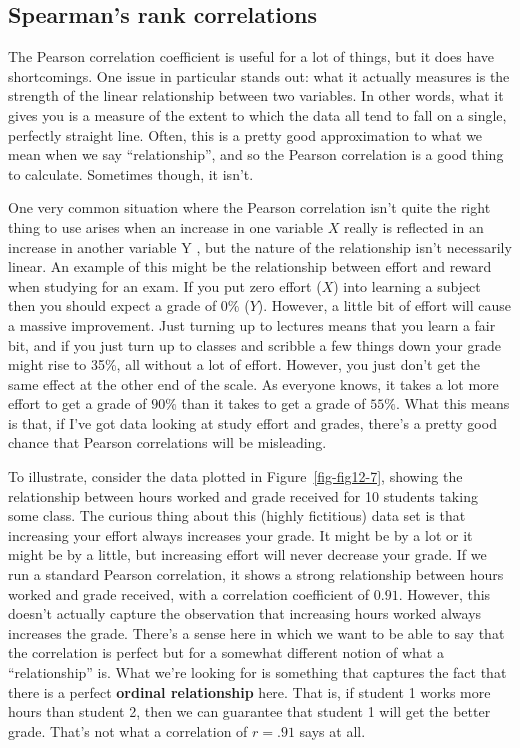 \documentclass[
  a4paper,
]{book}
\begin{document}
\hypertarget{spearmans-rank-correlations}{%
\subsection{Spearman's rank
correlations}\label{spearmans-rank-correlations}}

The Pearson correlation coefficient is useful for a lot of things, but
it does have shortcomings. One issue in particular stands out: what it
actually measures is the strength of the linear relationship between two
variables. In other words, what it gives you is a measure of the extent
to which the data all tend to fall on a single, perfectly straight line.
Often, this is a pretty good approximation to what we mean when we say
``relationship'', and so the Pearson correlation is a good thing to
calculate. Sometimes though, it isn't.

One very common situation where the Pearson correlation isn't quite the
right thing to use arises when an increase in one variable \(X\) really
is reflected in an increase in another variable Y , but the nature of
the relationship isn't necessarily linear. An example of this might be
the relationship between effort and reward when studying for an exam. If
you put zero effort (\(X\)) into learning a subject then you should
expect a grade of \(0\%\) (\(Y\)). However, a little bit of effort will
cause a massive improvement. Just turning up to lectures means that you
learn a fair bit, and if you just turn up to classes and scribble a few
things down your grade might rise to 35\%, all without a lot of effort.
However, you just don't get the same effect at the other end of the
scale. As everyone knows, it takes a lot more effort to get a grade of
\(90\%\) than it takes to get a grade of \(55\%\). What this means is
that, if I've got data looking at study effort and grades, there's a
pretty good chance that Pearson correlations will be misleading.

To illustrate, consider the data plotted in Figure~\ref{fig-fig12-7},
showing the relationship between hours worked and grade received for 10
students taking some class. The curious thing about this (highly
fictitious) data set is that increasing your effort always increases
your grade. It might be by a lot or it might be by a little, but
increasing effort will never decrease your grade. If we run a standard
Pearson correlation, it shows a strong relationship between hours worked
and grade received, with a correlation coefficient of \(0.91\). However,
this doesn't actually capture the observation that increasing hours
worked always increases the grade. There's a sense here in which we want
to be able to say that the correlation is perfect but for a somewhat
different notion of what a ``relationship'' is. What we're looking for
is something that captures the fact that there is a perfect
\textbf{ordinal relationship} here. That is, if student 1 works more
hours than student 2, then we can guarantee that student 1 will get the
better grade. That's not what a correlation of \(r = .91\) says at all.
\end{document}
